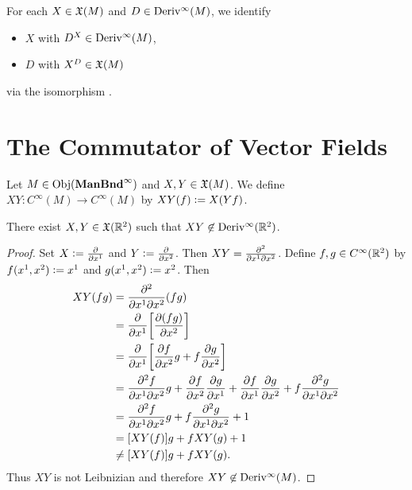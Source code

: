 \documentclass{book}
\begin{document}
\begin{note}
	For each $X \in \mathfrak{X}(M)$ and $D \in \operatorname{Deriv^{\infty}}(M)$, we identify 
	\begin{itemize}
		\item $X$ with $D^X \in \operatorname{Deriv^{\infty}}(M)$,
		\item $D$ with $X^D \in \mathfrak{X}(M)$
	\end{itemize}
	via the isomorphism . 
\end{note}









































\newpage
\section{The Commutator of Vector Fields}

\begin{defn}
	Let $M \in \operatorname{Obj}(\operatorname*{\text{\textbf{ManBnd}}^{\infty}})$ and $X,Y \in \mathfrak{X}(M)$. We define $XY: C^{\infty}(M) \rightarrow C^{\infty}(M)$ by $XY(f) \vcentcolon= X(Yf)$.
\end{defn}

\begin{ex}
	There exist $X, Y \in \mathfrak{X}(\mathbb{R}^2)$ such that $XY \not \in \operatorname{Deriv^{\infty}}(\mathbb{R}^2)$. 
\end{ex}

\begin{proof}
	Set $X \vcentcolon= \frac{\partial}{\partial x^1}$ and $Y \vcentcolon= \frac{\partial}{\partial x^2}$. Then $XY = \frac{\partial^2}{\partial x^1 \partial x^2}$. Define $f, g \in C^{\infty}(\mathbb{R}^2)$ by $f(x^1, x^2) \vcentcolon= x^1$ and $g(x^1, x^2) \vcentcolon= x^2$. Then 
	\begin{align*}
		XY(fg)
		& = \frac{\partial^2}{\partial x^1 \partial x^2}(fg) \\
		& = \frac{\partial}{\partial x^1} \bigg[ \frac{\partial(fg)}{\partial x^2}  \bigg] \\
		& = \frac{\partial}{\partial x^1} \bigg[ \frac{\partial f}{\partial x^2} g + f \frac{\partial g}{\partial x^2}   \bigg] \\
		& = \frac{\partial^2f}{\partial x^1 \partial x^2}g + \frac{\partial f}{\partial x^2} \frac{\partial g}{\partial x^1} + \frac{\partial f}{\partial x^1} \frac{\partial g}{\partial x^2} +  f\frac{\partial^2g}{\partial x^1 \partial x^2}  \\
		& = \frac{\partial^2f}{\partial x^1 \partial x^2}g + f\frac{\partial^2g}{\partial x^1 \partial x^2} + 1 \\
		& = [XY(f)]g + fXY(g) + 1 \\
		& \neq [XY(f)]g + fXY(g).
	\end{align*}
	Thus $XY$ is not Leibnizian and therefore $XY \not \in \operatorname{Deriv^{\infty}}(M)$.
\end{proof}
\end{document}

